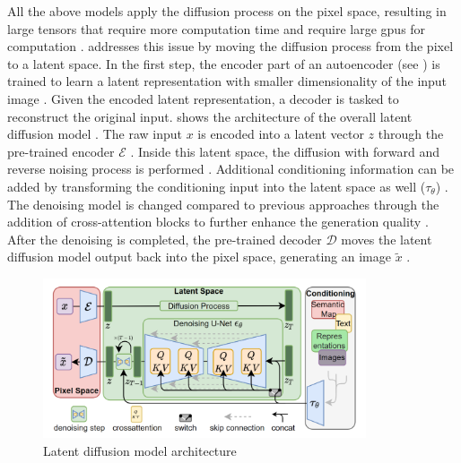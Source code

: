 All the above \glspl{model} apply the diffusion process on the pixel space, resulting in large tensors that require more computation time and require large \glspl{gpu} for computation \cite{rombach2022HighResolutionImageSynthesis}.
\textcite{rombach2022HighResolutionImageSynthesis} addresses this issue by moving the diffusion process from the pixel to a latent space.
In the first step, the encoder part of an autoencoder (see ) is trained to learn a latent representation with smaller dimensionality of the input image \cite{rombach2022HighResolutionImageSynthesis}.
Given the encoded latent representation, a decoder is tasked to reconstruct the original input.
 shows the architecture of the overall latent diffusion \gls{model} \cite[Figure 3, p.4]{rombach2022HighResolutionImageSynthesis}.
The raw input $x$ is encoded into a latent vector $z$ through the pre-trained encoder $\mathcal{E}$ \cite{rombach2022HighResolutionImageSynthesis}.
Inside this latent space, the diffusion with forward and reverse noising process is performed \cite{rombach2022HighResolutionImageSynthesis}.
Additional conditioning information can be added by transforming the conditioning input into the latent space as well ($\tau_\theta$) \cite{rombach2022HighResolutionImageSynthesis}.
The denoising \gls{model} is changed compared to previous approaches through the addition of cross-attention blocks to further enhance the generation quality \cite{rombach2022HighResolutionImageSynthesis}.
After the denoising is completed, the pre-trained decoder $\mathcal{D}$ moves the latent diffusion \gls{model} output back into the pixel space, generating an image $\tilde{x}$ \cite{rombach2022HighResolutionImageSynthesis}.

\begin{figure}[h]
    \centering
    \includegraphics[width=0.85\textwidth]{images/latent-diff.png}
    \caption[Latent Diffusion Model]{Latent diffusion model architecture \cite[Figure 3, p.4]{rombach2022HighResolutionImageSynthesis}}
    \label{fig:latent-diff}
\end{figure}

